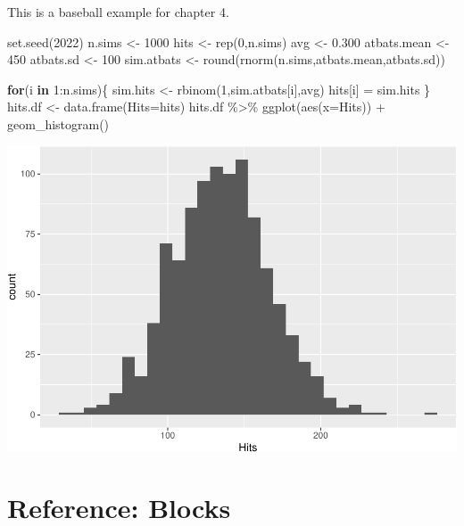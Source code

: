 \documentclass[
]{book}
\newenvironment{Shaded}{\begin{snugshade}}{\end{snugshade}}
\newcommand{\AttributeTok}[1]{\textcolor[rgb]{0.77,0.63,0.00}{#1}}
\newcommand{\ControlFlowTok}[1]{\textcolor[rgb]{0.13,0.29,0.53}{\textbf{#1}}}
\newcommand{\DecValTok}[1]{\textcolor[rgb]{0.00,0.00,0.81}{#1}}
\newcommand{\FloatTok}[1]{\textcolor[rgb]{0.00,0.00,0.81}{#1}}
\newcommand{\FunctionTok}[1]{\textcolor[rgb]{0.00,0.00,0.00}{#1}}
\newcommand{\NormalTok}[1]{#1}
\newcommand{\OtherTok}[1]{\textcolor[rgb]{0.56,0.35,0.01}{#1}}
\newcommand{\SpecialCharTok}[1]{\textcolor[rgb]{0.00,0.00,0.00}{#1}}
\theoremstyle{definition}
\theoremstyle{definition}
\theoremstyle{definition}
\theoremstyle{definition}
\theoremstyle{remark}
\begin{document}
This is a baseball example for chapter 4.

\begin{Shaded}
\begin{Highlighting}[]
\FunctionTok{set.seed}\NormalTok{(}\DecValTok{2022}\NormalTok{)}
\NormalTok{n.sims }\OtherTok{\textless{}{-}} \DecValTok{1000}
\NormalTok{hits }\OtherTok{\textless{}{-}} \FunctionTok{rep}\NormalTok{(}\DecValTok{0}\NormalTok{,n.sims)}
\NormalTok{avg }\OtherTok{\textless{}{-}} \FloatTok{0.300}
\NormalTok{atbats.mean }\OtherTok{\textless{}{-}} \DecValTok{450}
\NormalTok{atbats.sd }\OtherTok{\textless{}{-}} \DecValTok{100}
\NormalTok{sim.atbats }\OtherTok{\textless{}{-}} \FunctionTok{round}\NormalTok{(}\FunctionTok{rnorm}\NormalTok{(n.sims,atbats.mean,atbats.sd))}

\ControlFlowTok{for}\NormalTok{(i }\ControlFlowTok{in} \DecValTok{1}\SpecialCharTok{:}\NormalTok{n.sims)\{}
\NormalTok{  sim.hits }\OtherTok{\textless{}{-}} \FunctionTok{rbinom}\NormalTok{(}\DecValTok{1}\NormalTok{,sim.atbats[i],avg)}
\NormalTok{  hits[i] }\OtherTok{=}\NormalTok{ sim.hits}
\NormalTok{\}}
\NormalTok{hits.df }\OtherTok{\textless{}{-}} \FunctionTok{data.frame}\NormalTok{(}\AttributeTok{Hits=}\NormalTok{hits)}
\NormalTok{hits.df }\SpecialCharTok{\%\textgreater{}\%} \FunctionTok{ggplot}\NormalTok{(}\FunctionTok{aes}\NormalTok{(}\AttributeTok{x=}\NormalTok{Hits)) }\SpecialCharTok{+} \FunctionTok{geom\_histogram}\NormalTok{()}
\end{Highlighting}
\end{Shaded}

\includegraphics{series_files/figure-latex/baseball-sim-1.pdf}

\hypertarget{reference-blocks}{%
\chapter*{Reference: Blocks}\label{reference-blocks}}
\end{document}
